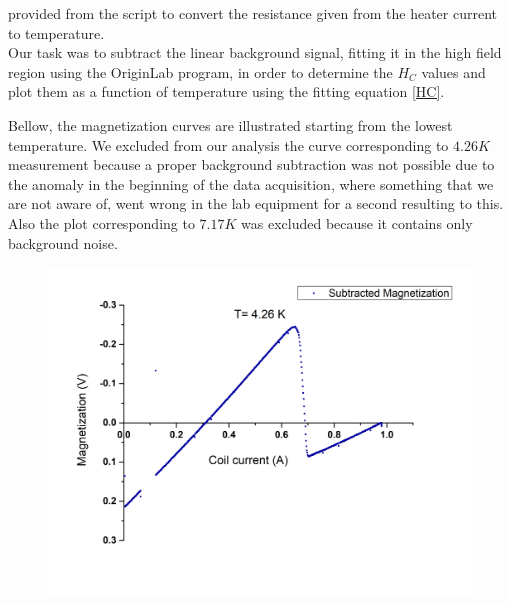 \documentclass[openany,11pt,a4paper]{report}
\begin{document}
provided from the script to convert the resistance given from the heater current to temperature.\\

Our task was to subtract the linear background signal, fitting it in the high field region using the OriginLab program, in order to determine the $H_{C}$ values and plot them as a function of temperature using the fitting equation \ref{HC}.


Bellow, the magnetization curves are illustrated starting from the lowest temperature. We excluded from our analysis the curve corresponding to $4.26 K$ measurement because a proper background subtraction was not possible due to the anomaly in the beginning of the data acquisition, where something that we are not aware of, went wrong in the lab equipment for a second resulting to this. Also the plot corresponding to $7.17 K$ was excluded because it contains only background noise. 




 

\begin{figure}[H]
\begin{center}
\includegraphics[scale=0.5]{426.jpg}
\end{center}
\end{figure}
\end{document}
